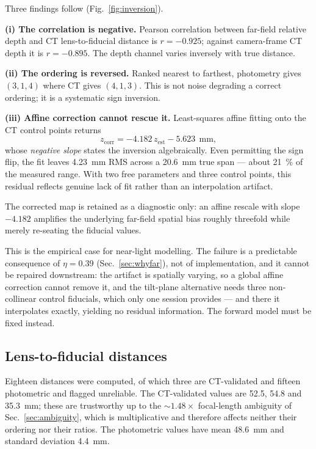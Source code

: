 \documentclass[journal,10pt]{IEEEtran}
\begin{document}
Three findings follow (Fig.~\ref{fig:inversion}).

\textbf{(i) The correlation is negative.} Pearson correlation between far-field
relative depth and CT lens-to-fiducial distance is $r = -0.925$; against
camera-frame CT depth it is $r=-0.895$. The depth channel varies inversely with
true distance.

\textbf{(ii) The ordering is reversed.} Ranked nearest to farthest, photometry
gives $(3,1,4)$ where CT gives $(4,1,3)$. This is not noise degrading a correct
ordering; it is a systematic sign inversion.

\textbf{(iii) Affine correction cannot rescue it.} Least-squares affine fitting
onto the CT control points returns
\begin{equation}
z_\mathrm{corr} = -4.182\, z_\mathrm{est} - 5.623 \ \ \text{mm},
\end{equation}
whose \emph{negative slope} states the inversion algebraically. Even permitting
the sign flip, the fit leaves \SI{4.23}{\milli\metre} RMS across a
\SI{20.6}{\milli\metre} true span --- about \SI{21}{\percent} of the measured
range. With two free parameters and three control points, this residual reflects
genuine lack of fit rather than an interpolation artifact.

The corrected map is retained as a diagnostic only: an affine rescale with slope
$-4.182$ amplifies the underlying far-field spatial bias roughly threefold while
merely re-seating the fiducial values.

This is the empirical case for near-light modelling. The failure is a predictable
consequence of $\eta = 0.39$ (Sec.~\ref{sec:whyfar}), not of implementation, and
it cannot be repaired downstream: the artifact is spatially varying, so a global
affine correction cannot remove it, and the tilt-plane alternative needs three
non-collinear control fiducials, which only one session provides --- and there it
interpolates exactly, yielding no residual information. The forward model must be
fixed instead.

\subsection{Lens-to-fiducial distances}
Eighteen distances were computed, of which three are CT-validated and fifteen
photometric and flagged unreliable. The CT-validated values are \num{52.5},
\num{54.8} and \SI{35.3}{\milli\metre}; these are trustworthy up to the
${\sim}1.48\times$ focal-length ambiguity of Sec.~\ref{sec:ambiguity}, which is
multiplicative and therefore affects neither their ordering nor their ratios.
The photometric values have mean \SI{48.6}{\milli\metre} and standard deviation
\SI{4.4}{\milli\metre}.
\end{document}
